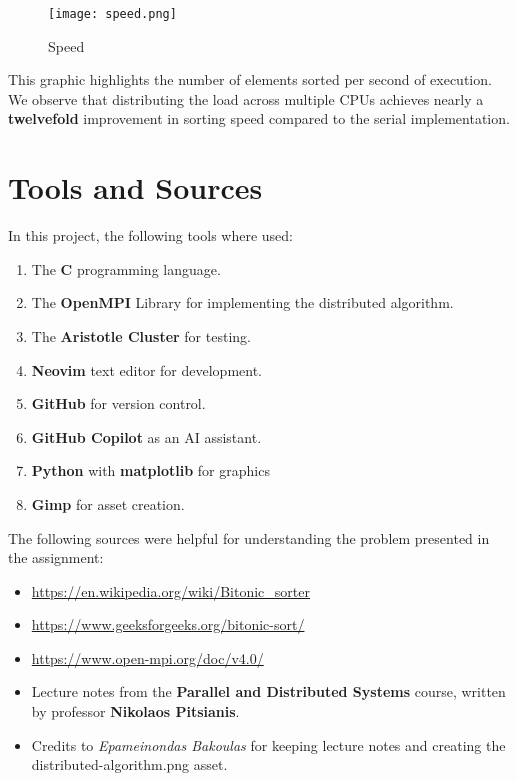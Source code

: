 \documentclass[12pt]{report}
\begin{document}
\begin{figure}[H]
    \centering
    \texttt{[image: speed.png]}
    \caption{Speed}
    \label{fig:enter-label}
\end{figure}

This graphic highlights the number of elements sorted per second of execution. We observe that distributing the load across multiple CPUs achieves nearly a \textbf{twelvefold} improvement in sorting speed compared to the serial implementation.

\chapter{Tools and Sources}

In this project, the following tools where used:
\begin{enumerate}
    \item The \textbf{C} programming language.
    \item The \textbf{OpenMPI} Library for implementing the distributed algorithm.
    \item The \textbf{Aristotle Cluster} for testing.
    \item \textbf{Neovim} text editor for development.
    \item \textbf{GitHub} for version control.
    \item \textbf{GitHub Copilot} as an AI assistant.
    \item \textbf{Python} with \textbf{matplotlib} for graphics
    \item \textbf{Gimp} for asset creation.
\end{enumerate}

The following sources were helpful for understanding the problem presented in the assignment:
\begin{itemize}
    \item \url{https://en.wikipedia.org/wiki/Bitonic_sorter}
    \item \url{https://www.geeksforgeeks.org/bitonic-sort/}
    \item \url{https://www.open-mpi.org/doc/v4.0/}
    \item Lecture notes from the \textbf{Parallel and Distributed Systems} course, written by professor \textbf{Nikolaos Pitsianis}.
    \item Credits to \textit{Epameinondas Bakoulas} for keeping lecture notes and creating the distributed-algorithm.png asset.
\end{itemize}
\end{document}
